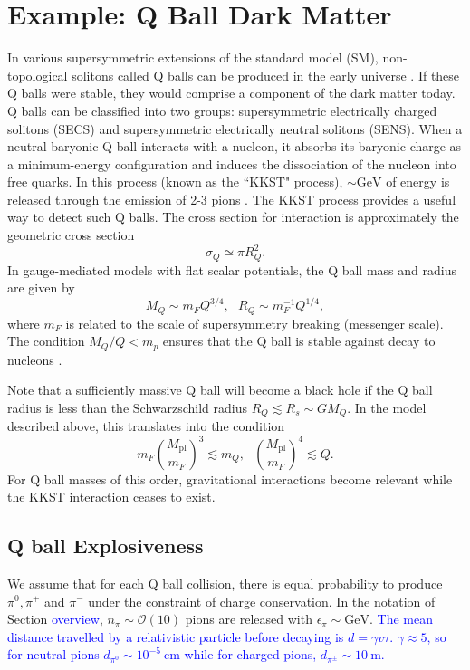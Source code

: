 \documentclass[twocolumn,showpacs,preprintnumbers,amsmath,amssymb,prl]{revtex4}
\newcommand{\OO}{\mathcal{O}}
\newcommand{\Mpl}{M_{\text{pl}}}
\def\r{\right)}
\def\l{\left(}
\begin{document}
\section{Example: Q Ball Dark Matter}
In various supersymmetric extensions of the standard model (SM), non-topological solitons called Q balls can be produced in the early universe \cite{Coleman:1985ki, Kusenko:1997si}. If these Q balls were stable, they would comprise a component of the dark matter today. Q balls can be classified into two groups: supersymmetric electrically charged solitons (SECS) and supersymmetric electrically neutral solitons (SENS). When a neutral baryonic Q ball interacts with a nucleon, it absorbs its baryonic charge as a minimum-energy configuration and induces the dissociation of the nucleon into free quarks. In this process (known as the ``KKST" process), $\sim \text{GeV}$ of energy is released through the emission of 2-3 pions \cite{Dine:2003ax}. The KKST process provides a useful way to detect such Q balls. The cross section for interaction is approximately the geometric cross section
\begin{equation}
\sigma_Q \simeq \pi R_Q^2.
\end{equation}
In gauge-mediated models with flat scalar potentials, the Q ball mass and radius are given by
\begin{equation}
M_Q \sim m_F Q^{3/4}, ~~~ R_Q \sim m_F^{-1} Q^{1/4},
\end{equation}
where $m_F$ is related to the scale of supersymmetry breaking (messenger scale). The condition $M_Q/Q < m_p$ ensures that the Q ball is stable against decay to nucleons \cite{Dine:2003ax}.

Note that a sufficiently massive Q ball will become a black hole if the Q ball radius is less than the Schwarzschild radius $R_Q \lesssim R_s \sim G M_Q$. In the model described above, this translates into the condition
\begin{equation}
m_F \l\frac{\Mpl}{m_F}\r^3 \lesssim m_Q, ~~~ \l\frac{\Mpl}{m_F}\r^4 \lesssim Q.
\end{equation}
For Q ball masses of this order, gravitational interactions become relevant while the KKST interaction ceases to exist.

\subsection{Q ball Explosiveness}
We assume that for each Q ball collision, there is equal probability to produce $\pi^0, \pi^+$ and $\pi^-$ under the constraint of charge conservation. In the notation of Section \textcolor{blue}{overview}, $n_{\pi} \sim \OO(10)$ pions are released with $\epsilon_{\pi} \sim \text{GeV}$. \textcolor{blue}{The mean distance travelled by a relativistic particle before decaying is $d = \gamma v \tau$. $\gamma \approx 5$, so for neutral pions $d_{\pi^0} \sim 10^{-5} ~\text{cm}$ while for charged pions, $d_{\pi^\pm} \sim 10 ~\text{m}$.}
\end{document}
